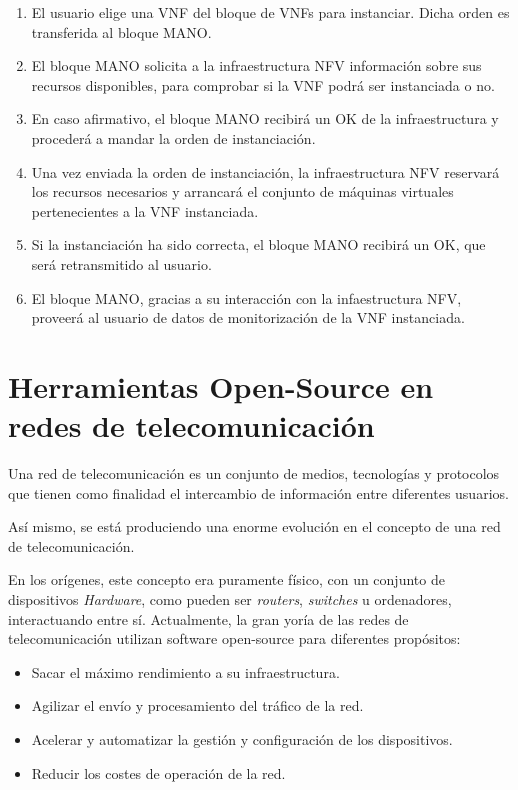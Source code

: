 \begin{enumerate}
	\item El usuario elige una VNF del bloque de VNFs para instanciar. Dicha orden es transferida al bloque MANO.
	\item El bloque MANO solicita a la infraestructura NFV información sobre sus recursos disponibles, para comprobar si la VNF podrá ser instanciada o no.
	\item En caso afirmativo, el bloque MANO recibirá un OK de la infraestructura y procederá a mandar la orden de instanciación.
	\item Una vez enviada la orden de instanciación, la infraestructura NFV reservará los recursos necesarios y arrancará el conjunto de máquinas virtuales pertenecientes a la VNF instanciada.
	\item Si la instanciación ha sido correcta, el bloque MANO recibirá un OK, que será retransmitido al usuario.
	\item El bloque MANO, gracias a su interacción con la infaestructura NFV, proveerá al usuario de datos de monitorización de la VNF instanciada.
\end{enumerate}


\section{Herramientas Open-Source en redes de telecomunicación}
\label{sec:opensourcenets}

Una red de telecomunicación es un conjunto de medios, tecnologías y protocolos que tienen como finalidad el intercambio de información entre diferentes usuarios.

Así mismo, se está produciendo una enorme evolución en el concepto de una red de telecomunicación. 

En los orígenes, este concepto era puramente físico, con un conjunto de dispositivos \textit{Hardware}, como pueden ser \textit{routers}, \textit{switches} u ordenadores, interactuando entre sí. Actualmente, la gran yoría de las redes de telecomunicación utilizan software open-source para diferentes propósitos:

\begin{itemize}
	\item Sacar el máximo rendimiento a su infraestructura.
	\item Agilizar el envío y procesamiento del tráfico de la red.
	\item Acelerar y automatizar la gestión y configuración de los dispositivos.
	\item Reducir los costes de operación de la red.
\end{itemize}

